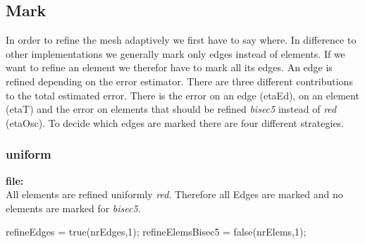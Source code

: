 \subsection{Mark}
In order to refine the mesh adaptively we first have to say where.
In difference to other implementations we generally mark only edges 
instead of elements. If we want to refine an element we therefor
have to mark all its edges.
An edge is refined depending on the error estimator.
There are three different contributions to the total estimated error.
There is the error on an edge (etaEd), on an element (etaT) and the 
error on elements that should be refined \emph{bisec5} instead of
\emph{red} (etaOsc). To decide which edges are marked there are four different
strategies.
%
%
\subsubsection{uniform}
\textbf{file:} \\[1.5ex]
All elements are refined uniformly \emph{red}. Therefore 
all Edges are marked and no elements are marked for \emph{bisec5}.
\begin{pcode}
refineEdges = true(nrEdges,1);
refineElemsBisec5 = false(nrElems,1);
\end{pcode}
%
